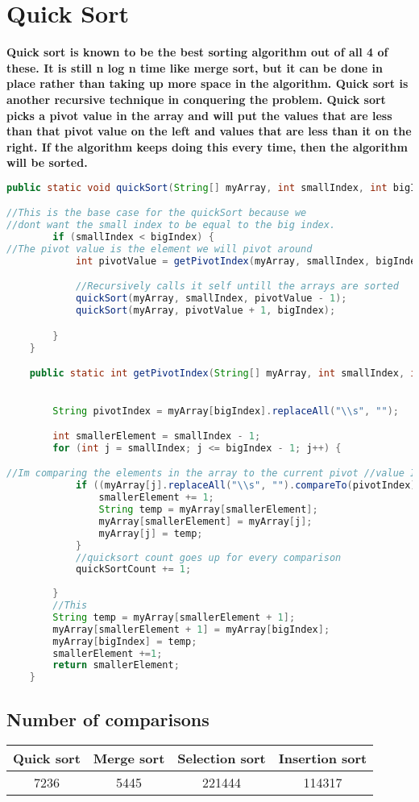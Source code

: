 \documentclass{article}
\begin{document}
\section{Quick Sort}
\textbf{Quick sort is known to be the best sorting algorithm out of all 4 of these. It is still n log n time like merge sort, but it can be done in place rather than taking up more space in the algorithm. Quick sort is another recursive technique in conquering the problem. Quick sort picks a pivot value in the array and will put the values that are less than that pivot value on the left and values that are less than it on the right. If the algorithm keeps doing this every time, then the algorithm will be sorted. }
\begin{lstlisting}[language = java]
public static void quickSort(String[] myArray, int smallIndex, int bigIndex) {

//This is the base case for the quickSort because we 
//dont want the small index to be equal to the big index.
        if (smallIndex < bigIndex) {
//The pivot value is the element we will pivot around
            int pivotValue = getPivotIndex(myArray, smallIndex, bigIndex);

            //Recursively calls it self untill the arrays are sorted
            quickSort(myArray, smallIndex, pivotValue - 1);
            quickSort(myArray, pivotValue + 1, bigIndex);

        }
    }

    public static int getPivotIndex(String[] myArray, int smallIndex, int bigIndex) {

        
        String pivotIndex = myArray[bigIndex].replaceAll("\\s", "");

        int smallerElement = smallIndex - 1;
        for (int j = smallIndex; j <= bigIndex - 1; j++) {

//Im comparing the elements in the array to the current pivot //value If the element is smaller than the right then it will be on //the left otherwise its on the right
            if ((myArray[j].replaceAll("\\s", "").compareTo(pivotIndex)) < 0) {
                smallerElement += 1;
                String temp = myArray[smallerElement];
                myArray[smallerElement] = myArray[j];
                myArray[j] = temp;
            }
            //quicksort count goes up for every comparison
            quickSortCount += 1;
            
        }
        //This 
        String temp = myArray[smallerElement + 1];
        myArray[smallerElement + 1] = myArray[bigIndex];
        myArray[bigIndex] = temp;
        smallerElement +=1;
        return smallerElement;
    }
\end{lstlisting}

\begin{center}
\section{Number of comparisons}
\begin{tabular}{||c c c c||} 
 \hline
Quick sort & Merge sort & Selection sort & Insertion sort \\ [0.5ex] 
 \hline\hline
 7236 & 5445 & 221444 & 114317 \\ 
 \hline

\end{tabular}
\end{center}
\end{document}

